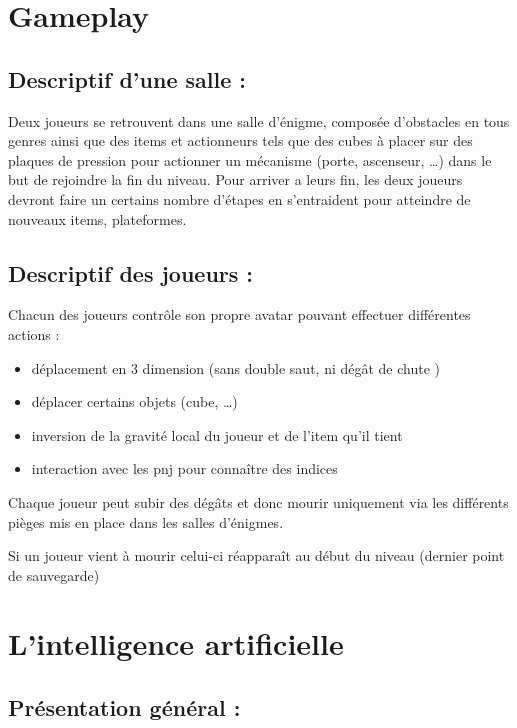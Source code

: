 \documentclass[a4paper,11pt]{article}
\begin{document}
\section{Gameplay}

\subsection{Descriptif d’une salle :} 

Deux joueurs se retrouvent dans une salle d'énigme, 
composée d’obstacles en tous genres ainsi que des items et actionneurs tels que des cubes 
à placer sur des plaques de pression pour actionner un mécanisme (porte, ascenseur, …) dans 
le but de rejoindre la fin du niveau. Pour arriver a leurs fin, les deux joueurs devront faire 
un certains nombre d’étapes en s’entraident pour atteindre de nouveaux items, plateformes.\newline

\subsection{Descriptif des joueurs :} 

Chacun des joueurs contrôle son propre avatar pouvant effectuer différentes actions : 
\newline

\begin{itemize}
    \item déplacement en 3 dimension (sans double saut, ni dégât de chute )
    \item déplacer certains objets (cube, …)
    \item inversion de la gravité local du joueur et de l’item qu’il tient
    \item interaction avec les pnj pour connaître des indices \newline
\end{itemize}



Chaque joueur peut subir des dégâts et donc mourir uniquement via les différents pièges
 mis en place dans les salles d'énigmes.

Si un joueur vient à mourir celui-ci réapparaît au début du niveau (dernier point de sauvegarde) 

\section{L’intelligence artificielle}

\subsection{Présentation général :}
\end{document}
